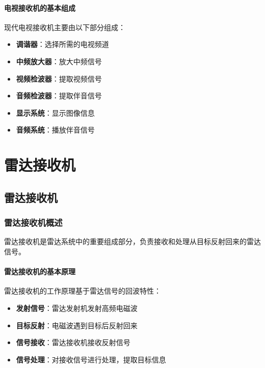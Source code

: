 \documentclass[12pt,UTF8]{ctexbook}
\begin{document}
\subsection{电视接收机的基本组成}

现代电视接收机主要由以下部分组成：

\begin{itemize}[leftmargin=3.5em]
    \item \textbf{调谐器}：选择所需的电视频道
    \item \textbf{中频放大器}：放大中频信号
    \item \textbf{视频检波器}：提取视频信号
    \item \textbf{音频检波器}：提取伴音信号
    \item \textbf{显示系统}：显示图像信息
    \item \textbf{音频系统}：播放伴音信号
\end{itemize}

\part{雷达接收机}

\chapter{雷达接收机}

\section{雷达接收机概述}

雷达接收机是雷达系统中的重要组成部分，负责接收和处理从目标反射回来的雷达信号。

\subsection{雷达接收机的基本原理}

雷达接收机的工作原理基于雷达信号的回波特性：

\begin{itemize}[leftmargin=3.5em]
    \item \textbf{发射信号}：雷达发射机发射高频电磁波
    \item \textbf{目标反射}：电磁波遇到目标后反射回来
    \item \textbf{信号接收}：雷达接收机接收反射信号
    \item \textbf{信号处理}：对接收信号进行处理，提取目标信息
\end{itemize}
\end{document}
